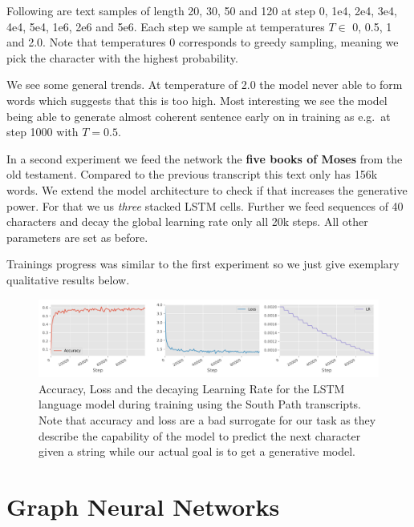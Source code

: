 \documentclass{article}
\begin{document}
Following are text samples of length 20, 30, 50 and 120 at step 0, 1e4, 2e4, 3e4, 4e4, 5e4, 1e6, 2e6 and 5e6.
Each step we sample at temperatures \(T\in\) 0, 0.5, 1 and 2.0.
Note that temperatures 0 corresponds to greedy sampling, meaning we pick the character with the highest probability.

\vspace{1em}

\vspace{1em}

We see some general trends.
At temperature of 2.0 the model never able to form words which suggests that this is too high.
Most interesting we see the model being able to generate almost coherent sentence early on in training as e.g.\ at step 1000 with \(T=0.5\).

In a second experiment we feed the network the \textbf{five books of Moses} from the old testament.
Compared to the previous transcript this text only has 156k words.
We extend the model architecture to check if that increases the generative power.
For that we us \textit{three} stacked LSTM cells.
Further we feed sequences of 40 characters and decay the global learning rate only all 20k steps.
All other parameters are set as before.

Trainings progress was similar to the first experiment so we just give exemplary qualitative results below.

\begin{figure}
  \centering
  \includegraphics[width=\linewidth]{assignment_2/part2/results/southpark_2/southpark.pdf}
  \caption{Accuracy, Loss and the decaying Learning Rate for the LSTM language model during training using the South Path transcripts.
  Note that accuracy and loss are a bad surrogate for our task as they describe the capability of the model to predict the next character given a string while our actual goal is to get a generative model.}
  \label{fig:training_southpark}
\end{figure}

\section{Graph Neural Networks}
\end{document}
